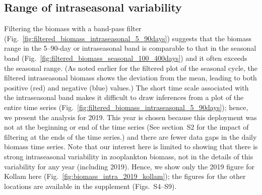 \documentclass[authoryear,review,11pt]{elsarticle}
\begin{document}

\subsection{Range of intraseasonal variability}
\label{sec:intraseasonal.range}

Filtering the biomass with a band-pass filter (Fig.~\ref{fig:filtered_biomass_intraseasonal_5_90days}) suggests that the biomass range in the 5--90-day or intraseasonal band is comparable to that in the seasonal band (Fig.~\ref{fig:filtered_biomass_seasonal_100_400days}) and it often exceeds the seasonal range. (As noted earlier for the filtered plot of the seasonal cycle, the filtered intraseasonal biomass shows the deviation from the mean, leading to both positive (red) and negative (blue) values.) The short time scale associated with the intraseasonal band makes it difficult to draw inferences from a plot of the entire time series (Fig.~\ref{fig:filtered_biomass_intraseasonal_5_90days}); hence, we present the analysis for 2019. This year is chosen because this deployment was not at the beginning or end of the time series (See section~S2 for the impact of filtering at the ends of the time series.) and there are fewer data gaps in the daily biomass time series. Note that our interest here is limited to showing that there is strong intraseasonal variability in zooplankton biomass, not in the details of this variability for any year (including 2019).  Hence, we show only the 2019 figure for Kollam here (Fig.~\ref{fig:biomass_intra_2019_kollam}); the figures for the other locations are available in the supplement (Figs.~S4--S9).
\end{document}
